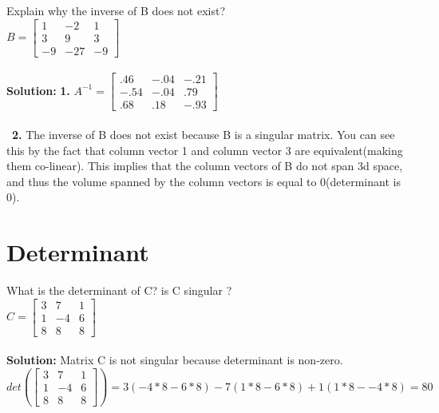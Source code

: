 \documentclass{article}
\begin{document}
Explain why the inverse of B does not exist?\\
$B=
\begin{bmatrix}
1 & -2 & 1\\
3 & 9 & 3 \\
-9 & -27 & -9
\end{bmatrix}$\\\\
\textbf{Solution: }
\textbf{1. }$A^{-1}=
\begin{bmatrix}
.46 & -.04 & -.21\\
-.54 & -.04 & .79 \\
.68 & .18 & -.93
\end{bmatrix}$\\\\\
\textbf{2. } The inverse of B does not exist because B is a singular matrix. You can see this by the fact that column vector 1 and column vector 3 are equivalent(making them co-linear). This implies that the column vectors of B do not span 3d space, and thus the volume spanned by the column vectors is equal to 0(determinant is 0).

\section{Determinant}
What is the determinant of C? is C singular ? \\
$C=
\begin{bmatrix}
3 & 7 & 1\\
1 & -4 & 6 \\
8 & 8 & 8
\end{bmatrix}$\\\\
\textbf{Solution: }
Matrix C is not singular because determinant is non-zero.\\
$det(\begin{bmatrix}
3 & 7 & 1\\
1 & -4 & 6\\
8 & 8 & 8
\end{bmatrix})=3(-4*8 - 6*8)-7(1*8-6*8)+1(1*8--4*8)=80$
\end{document}
